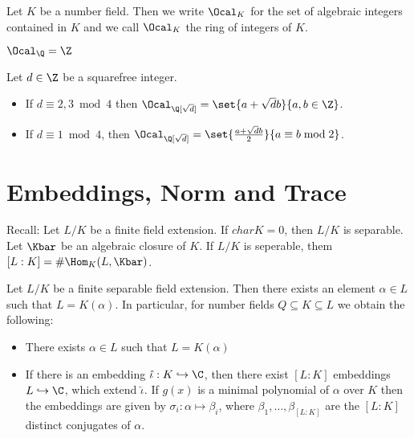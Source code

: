 
\begin{defn*}
	Let \( K \) be a number field.
	Then we write \( \Ocal_K \) for the set of algebraic integers contained in \( K \) and we call \( \Ocal_K \) the ring of integers of \( K \).
\end{defn*}

\begin{exmp*}
	\( \Ocal_\Q = \Z \)
\end{exmp*}

\begin{prop}
	Let \( d \in \Z \) be a squarefree integer.
	\begin{itemize}
		\item If \( d \equiv 2,3 \bmod 4 \) then \( \Ocal_{\Q[\sqrt{d}]} = \set{a + \sqrt{d}b}{a,b \in \Z} \).
		\item If \( d \equiv 1 \bmod 4 \), then \( \Ocal_{\Q[\sqrt{d}]} = \set{\frac{a+\sqrt{d}b}{2}}{a \equiv b \bmod 2} \).
	\end{itemize}
\end{prop}


\section{Embeddings, Norm and Trace}

Recall: Let \( L/K \) be a finite field extension.
If \( char K = 0 \), then \( L/K \) is separable.
Let \( \Kbar \) be an algebraic closure of \( K \). If \( L/K \) is seperable, them \( [L:K] = \#\Hom_K (L, \Kbar) \).

\begin{thm*}
	Let \( L/K \) be a finite separable field extension.
	Then there exists an element \( \alpha \in L \) such that \( L = K(\alpha) \).
	In particular, for number fields \( Q \subseteq K \subseteq L \) we obtain the following:
	\begin{itemize}
		\item There exists \( \alpha \in L \) such that \( L = K(\alpha) \)
		\item If there is an embedding \( \hat{\iota}: K \hookrightarrow \C \), then there exist \( [L:K] \) embeddings \( L \hookrightarrow \C \), which extend \( \hat{\iota} \). If \( g(x) \) is a minimal polynomial of \( \alpha \) over \( K \) then the embeddings are given by \( \sigma_i: \alpha \mapsto \beta_i \), where \( \beta_1, \dotsc, \beta_{[L:K]} \) are the \( [L:K] \) distinct conjugates of \( \alpha \).
	\end{itemize}
\end{thm*}

